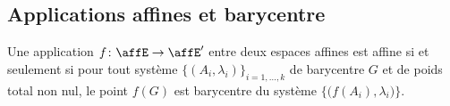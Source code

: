 \subsection{Applications affines et barycentre}

\begin{proposition}      \label{PROPooGSPZooRnVgiU}
	Une application \( f\colon \affE\to \affE'\) entre deux espaces affines est affine si et seulement si pour tout système \( \{ (A_i,\lambda_i) \}_{i=1,\ldots, k}\) de barycentre \( G\) et de poids total non nul, le point \( f(G)\) est barycentre du système \( \{ \big(f(A_i),\lambda_i\big) \}\).
\end{proposition}

